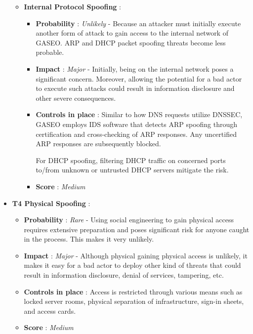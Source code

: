 \documentclass[12pt]{article}
\begin{document}
\begin{itemize}
\begin{itemize}
            \item  \textbf{ Internal Protocol Spoofing }:
            \begin{itemize}
                \item  \textbf{ Probability }: \textit{Unlikely} - Because an attacker must initially execute another form of attack to gain access to the internal network of GASEO. ARP and DHCP packet spoofing threats become less probable.
                \item  \textbf{ Impact }:  \textit{Major} -  Initially, being on the internal network poses a significant concern. Moreover, allowing the potential for a bad actor to execute such attacks could result in information disclosure and other severe consequences.
                \item \textbf{ Controls in place }: Similar to how DNS requests utilize DNSSEC, GASEO employs IDS software that detects ARP spoofing through certification and cross-checking of ARP responses. Any uncertified ARP responses are subsequently blocked.

                For DHCP spoofing, filtering DHCP traffic on concerned ports to/from unknown or untrusted DHCP servers mitigate the risk.
                \item \textbf{ Score } : \textit{Medium}
            \end{itemize}
        \end{itemize}

    \item \textbf{ T4 Physical Spoofing }: 
        \begin{itemize}
            \item  \textbf{ Probability }: \textit{Rare} - Using social engineering to gain physical access requires extensive preparation and poses significant risk for anyone caught in the process. This makes it very  unlikely.
            \item  \textbf{ Impact }:  \textit{Major} - Although physical gaining physical access is unlikely, it makes it easy for a bad actor to deploy other kind of threats that could result in information disclosure, denial of services, tampering, etc.
            \item \textbf{ Controls in place }: Access is restricted through various means such as locked server rooms, physical separation of infrastructure, sign-in sheets, and access cards.
            \item \textbf{ Score } : \textit{Medium}
         \end{itemize}
    
\end{itemize}
\end{document}
